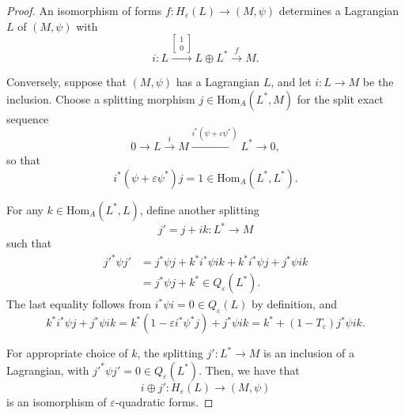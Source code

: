 \documentclass[10pt,a4paper]{amsart}
\begin{document}
\begin{proof}
 An isomorphism of forms \( f : H_\varepsilon(L) \to (M, \psi) \) determines a Lagrangian \( L \) of \( (M, \psi) \) with
\[
i : L \xrightarrow{\left[ \begin{smallmatrix} 1 \\ 0 \end{smallmatrix} \right]} L \oplus L^* \xrightarrow{f} M.
\]

Conversely, suppose that \( (M, \psi) \) has a Lagrangian \( L \), and let \( i : L \to M \) be the inclusion. Choose a splitting morphism \( j \in \mathrm{Hom}_A(L^*, M) \) for the split exact sequence
\[
0 \to L \xrightarrow{i} M \xrightarrow{i^*(\psi + \varepsilon \psi^*)} L^* \to 0,
\]
so that
\[
i^*(\psi + \varepsilon \psi^*)j = 1 \in \mathrm{Hom}_A(L^*, L^*).
\]

For any \( k \in \mathrm{Hom}_A(L^*, L) \), define another splitting
\[
j' = j + ik : L^* \to M
\]
such that
\[
\begin{aligned}
j'^* \psi j' &= j^* \psi j + k^* i^* \psi i k + k^* i^* \psi j + j^* \psi i k \\
             &= j^* \psi j + k^* \in Q_\varepsilon(L^*).
\end{aligned}
\]
The last equality follows from $i^*\psi i=0 \in Q_\varepsilon(L)$ by definition, and
$$k^*i^*\psi j +j^*\psi ik=k^*(1-\varepsilon i^*\psi^*j) +j^*\psi ik=k^* +(1-T_\varepsilon) j^*\psi ik.$$

For appropriate choice of $k$, the splitting \( j' : L^* \to M \)  is an inclusion of a Lagrangian, with
$j'^* \psi j' = 0 \in Q_\varepsilon(L^*).$ Then, we have that
\[
i \oplus j' : H_\varepsilon(L) \to (M, \psi)
\]
is an isomorphism of \( \varepsilon \)-quadratic forms. 
\end{proof}
\end{document}
